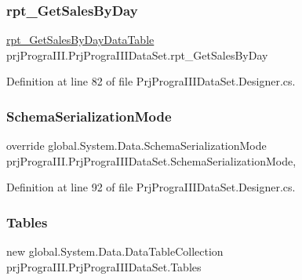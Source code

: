 \subsubsection{\texorpdfstring{rpt\+\_\+\+Get\+Sales\+By\+Day}{rpt\_GetSalesByDay}}
{\footnotesize\ttfamily \hyperlink{classprj_progra_i_i_i_1_1_prj_progra_i_i_i_data_set_1_1rpt___get_sales_by_day_data_table}{rpt\+\_\+\+Get\+Sales\+By\+Day\+Data\+Table} prj\+Progra\+I\+I\+I.\+Prj\+Progra\+I\+I\+I\+Data\+Set.\+rpt\+\_\+\+Get\+Sales\+By\+Day\hspace{0.3cm}{\ttfamily [get]}}



Definition at line 82 of file Prj\+Progra\+I\+I\+I\+Data\+Set.\+Designer.\+cs.

\hypertarget{classprj_progra_i_i_i_1_1_prj_progra_i_i_i_data_set_af16a178de369ee71e88ff6a27756a156}{}\label{classprj_progra_i_i_i_1_1_prj_progra_i_i_i_data_set_af16a178de369ee71e88ff6a27756a156} 
\subsubsection{\texorpdfstring{Schema\+Serialization\+Mode}{SchemaSerializationMode}}
{\footnotesize\ttfamily override global.\+System.\+Data.\+Schema\+Serialization\+Mode prj\+Progra\+I\+I\+I.\+Prj\+Progra\+I\+I\+I\+Data\+Set.\+Schema\+Serialization\+Mode\hspace{0.3cm}{\ttfamily [get]}, {\ttfamily [set]}}



Definition at line 92 of file Prj\+Progra\+I\+I\+I\+Data\+Set.\+Designer.\+cs.

\hypertarget{classprj_progra_i_i_i_1_1_prj_progra_i_i_i_data_set_a2448ccb1b6a4be8af285aacb89bdf544}{}\label{classprj_progra_i_i_i_1_1_prj_progra_i_i_i_data_set_a2448ccb1b6a4be8af285aacb89bdf544} 
\subsubsection{\texorpdfstring{Tables}{Tables}}
{\footnotesize\ttfamily new global.\+System.\+Data.\+Data\+Table\+Collection prj\+Progra\+I\+I\+I.\+Prj\+Progra\+I\+I\+I\+Data\+Set.\+Tables\hspace{0.3cm}{\ttfamily [get]}}



